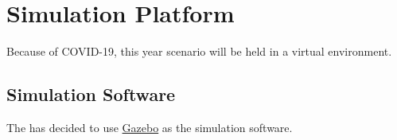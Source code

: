 \section{Simulation Platform}
\label{sec:rules:simulation}

Because of COVID-19, this year scenario will be held in a virtual environment.
\subsection{Simulation Software}
\label{sec:rules:simulationsoftware}
The \TC{} has decided to use \href{http://gazebosim.org/}{Gazebo} as the simulation software.